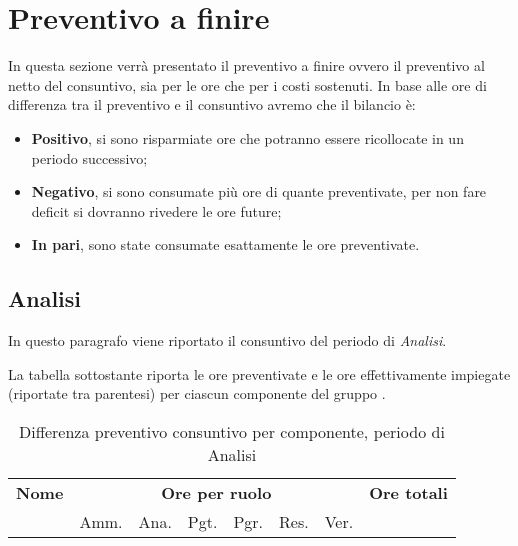 

\section{Preventivo a finire}
\label{consuntivo}

In questa sezione verrà presentato il preventivo a finire ovvero il preventivo al netto del consuntivo, sia per le ore che per i costi sostenuti. In base alle ore di differenza tra il preventivo e il consuntivo avremo che il bilancio è:
\begin{itemize}
\item \textbf{Positivo}, si sono risparmiate ore che potranno essere ricollocate in un periodo successivo;
\item \textbf{Negativo}, si sono consumate più ore di quante preventivate, per non fare deficit si dovranno rivedere le ore future;
\item \textbf{In pari}, sono state consumate esattamente le ore preventivate.
\end{itemize}

\subsection{Analisi}

In questo paragrafo viene riportato il consuntivo del periodo di \textit{Analisi}.

La tabella sottostante riporta le ore preventivate e le ore effettivamente impiegate (riportate tra parentesi) per ciascun componente del gruppo \GroupName{}.

\begin{table}[H]
\begin{tabular}{lccccccc}
\toprule
    \textbf{Nome}  & \multicolumn{6}{c}{\textbf{Ore per ruolo}} & \textbf{Ore totali} \\
     & Amm. & Ana. & Pgt. & Pgr. & Res. & Ver. & \\
    \midrule
    
    	
    
    \bottomrule
\end{tabular}
\caption{Differenza preventivo consuntivo per componente, periodo di Analisi}
\end{table}


